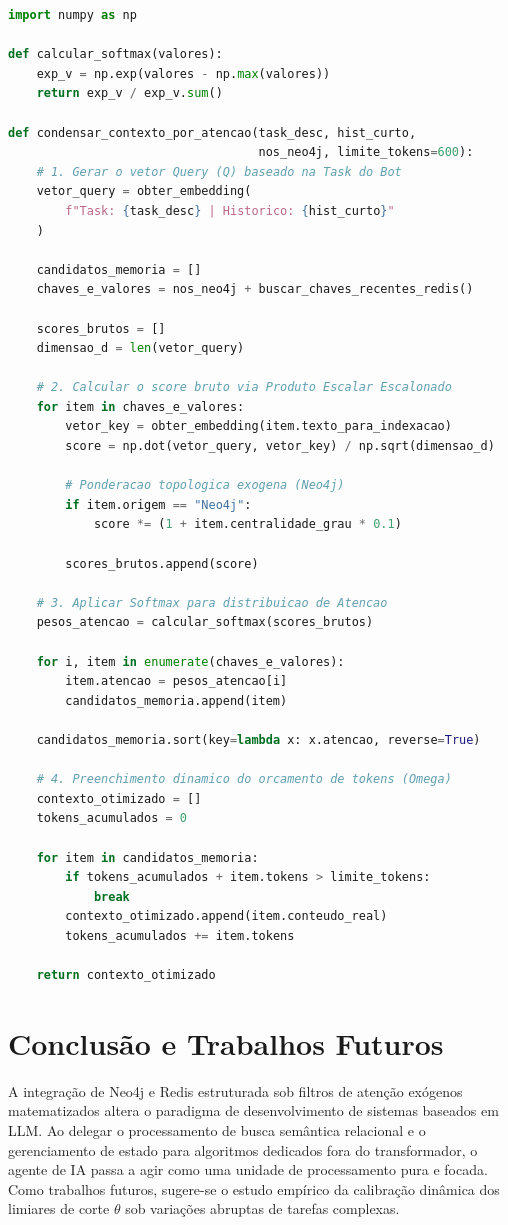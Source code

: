 \documentclass[11pt,a4paper]{article}
\begin{document}
\begin{lstlisting}[language=Python, caption=Middleware de Gerenciamento Cognitivo de Contexto]
import numpy as np

def calcular_softmax(valores):
    exp_v = np.exp(valores - np.max(valores))
    return exp_v / exp_v.sum()

def condensar_contexto_por_atencao(task_desc, hist_curto,
                                   nos_neo4j, limite_tokens=600):
    # 1. Gerar o vetor Query (Q) baseado na Task do Bot
    vetor_query = obter_embedding(
        f"Task: {task_desc} | Historico: {hist_curto}"
    )

    candidatos_memoria = []
    chaves_e_valores = nos_neo4j + buscar_chaves_recentes_redis()

    scores_brutos = []
    dimensao_d = len(vetor_query)

    # 2. Calcular o score bruto via Produto Escalar Escalonado
    for item in chaves_e_valores:
        vetor_key = obter_embedding(item.texto_para_indexacao)
        score = np.dot(vetor_query, vetor_key) / np.sqrt(dimensao_d)

        # Ponderacao topologica exogena (Neo4j)
        if item.origem == "Neo4j":
            score *= (1 + item.centralidade_grau * 0.1)

        scores_brutos.append(score)

    # 3. Aplicar Softmax para distribuicao de Atencao
    pesos_atencao = calcular_softmax(scores_brutos)

    for i, item in enumerate(chaves_e_valores):
        item.atencao = pesos_atencao[i]
        candidatos_memoria.append(item)

    candidatos_memoria.sort(key=lambda x: x.atencao, reverse=True)

    # 4. Preenchimento dinamico do orcamento de tokens (Omega)
    contexto_otimizado = []
    tokens_acumulados = 0

    for item in candidatos_memoria:
        if tokens_acumulados + item.tokens > limite_tokens:
            break
        contexto_otimizado.append(item.conteudo_real)
        tokens_acumulados += item.tokens

    return contexto_otimizado
\end{lstlisting}


\section{Conclusão e Trabalhos Futuros}

A integração de Neo4j e Redis estruturada sob filtros de atenção exógenos matematizados altera o
paradigma de desenvolvimento de sistemas baseados em LLM. Ao delegar o processamento de busca
semântica relacional e o gerenciamento de estado para algoritmos dedicados fora do transformador,
o agente de IA passa a agir como uma unidade de processamento pura e focada. Como trabalhos
futuros, sugere-se o estudo empírico da calibração dinâmica dos limiares de corte $\theta$ sob
variações abruptas de tarefas complexas.
\end{document}
